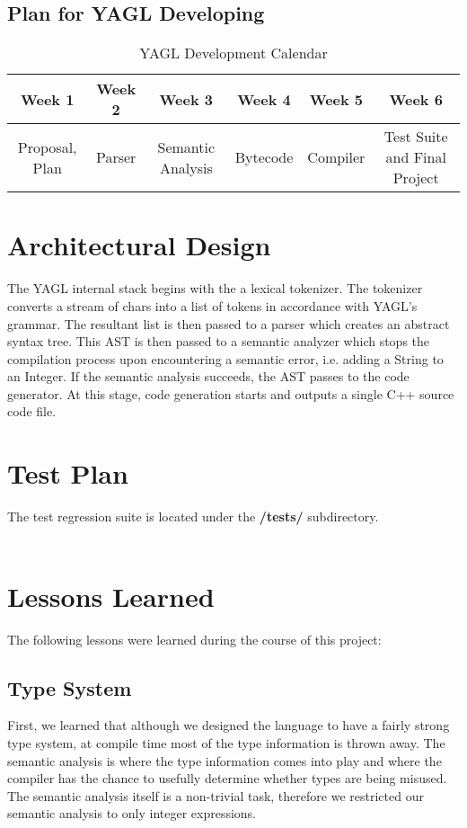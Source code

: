 \documentclass[12pt]{article}
\begin{document}
\subsection{Plan for YAGL Developing }
\begin{table}[H]
\caption{YAGL Development Calendar}
\centering
\begin{tabular}{c c c c c c}

\textbf{Week 1} & \textbf{Week 2} & \textbf{Week 3} & \textbf{Week 4} & \textbf{Week 5} & \textbf{Week 6}\\ [0.5ex] %
\hline
Proposal, Plan&Parser&Semantic Analysis&Bytecode&Compiler&Test Suite and Final Project \\

\hline
\end{tabular}
\end{table}
\section{Architectural Design}
The YAGL internal stack begins with the a lexical tokenizer. The tokenizer converts a stream of chars into a 
list of tokens in accordance with YAGL's grammar. The resultant list is then passed to a parser which creates an 
abstract syntax tree. This AST is then passed to a 
semantic analyzer which stops the compilation process
upon encountering a semantic error, i.e. adding a String to an Integer. If the semantic analysis succeeds, the AST 
passes to the code generator. At this stage, code generation starts and outputs a single C++ source code file. 

\section{Test Plan}
The test regression suite is located under the \textbf{/tests/} subdirectory. \\\\


\section{Lessons Learned}

The following lessons were learned during the course of this project:
\subsection{Type System}
First, we learned that although we designed the language to have a fairly strong type system, at compile time most of the type information is thrown away.  The semantic analysis is where the type information comes into play and where the compiler has the chance to usefully determine whether types are being misused.  The semantic analysis itself is a non-trivial task, therefore we restricted our semantic analysis to only integer expressions.
\end{document}
